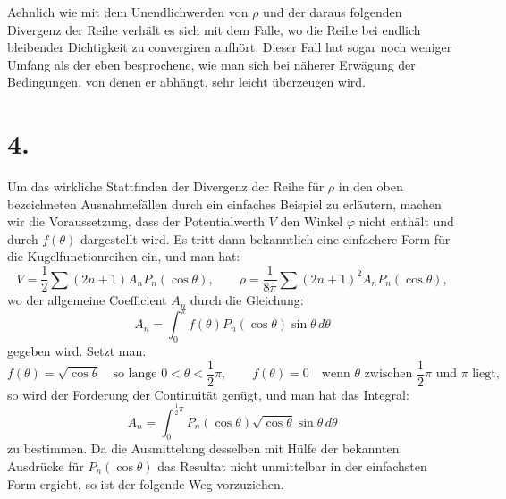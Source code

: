 \documentclass[11pt]{article}
\newcommand{\dd}{\,d}
\begin{document}
Aehnlich wie mit dem Unendlichwerden von $\rho$ und der daraus folgenden Divergenz der Reihe verhält es sich mit dem Falle, wo die Reihe bei endlich bleibender Dichtigkeit zu convergiren aufhört. Dieser Fall hat sogar noch weniger Umfang als der eben besprochene, wie man sich bei näherer Erwägung der Bedingungen, von denen er abhängt, sehr leicht überzeugen wird.

\section*{4.}

Um das wirkliche Stattfinden der Divergenz der Reihe für $\rho$ in den oben bezeichneten Ausnahmefällen durch ein einfaches Beispiel zu erläutern, machen wir die Voraussetzung, dass der Potentialwerth $V$ den Winkel $\varphi$ nicht enthält und durch $f(\theta)$ dargestellt wird. Es tritt dann bekanntlich eine einfachere Form für die Kugelfunctionreihen ein, und man hat:
\[
 V=\frac12\sum(2n+1)A_nP_n(\cos\theta),\qquad
 \rho=\frac1{8\pi}\sum(2n+1)^2A_nP_n(\cos\theta),
\]
wo der allgemeine Coefficient $A_n$ durch die Gleichung:
\[
 A_n=\int_0^\pi f(\theta)P_n(\cos\theta)\sin\theta\dd\theta
\]
gegeben wird. Setzt man:
\[
 f(\theta)=\sqrt{\cos\theta}\quad\text{so lange }0<\theta<\frac12\pi,
\qquad
 f(\theta)=0\quad\text{wenn }\theta\text{ zwischen }\frac12\pi\text{ und }\pi\text{ liegt},
\]
so wird der Forderung der Continuität genügt, und man hat das Integral:
\[
 A_n=\int_0^{\frac12\pi}P_n(\cos\theta)\sqrt{\cos\theta}\sin\theta\dd\theta
\]
zu bestimmen. Da die Ausmittelung desselben mit Hülfe der bekannten Ausdrücke für $P_n(\cos\theta)$ das Resultat nicht unmittelbar in der einfachsten Form ergiebt, so ist der folgende Weg vorzuziehen.
\end{document}
